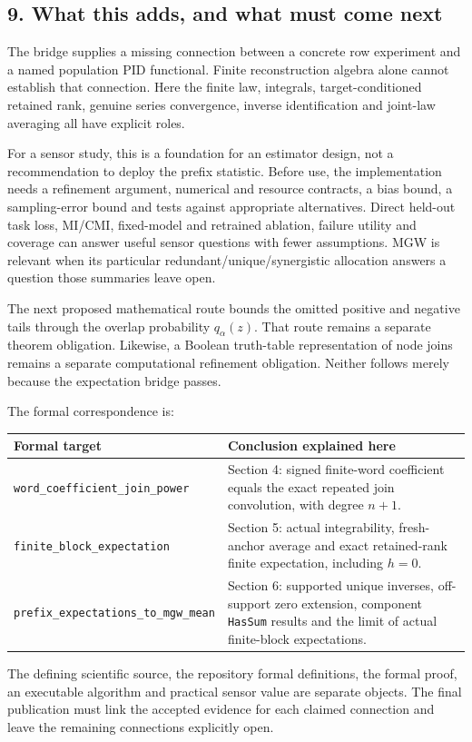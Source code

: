 \subsection{9. What this adds, and what must come next}\label{what-this-adds-and-what-must-come-next}

The bridge supplies a missing connection between a concrete row experiment and a named population PID functional. Finite reconstruction algebra alone cannot establish that connection. Here the finite law, integrals, target-conditioned retained rank, genuine series convergence, inverse identification and joint-law averaging all have explicit roles.

For a sensor study, this is a foundation for an estimator design, not a recommendation to deploy the prefix statistic. Before use, the implementation needs a refinement argument, numerical and resource contracts, a bias bound, a sampling-error bound and tests against appropriate alternatives. Direct held-out task loss, MI/CMI, fixed-model and retrained ablation, failure utility and coverage can answer useful sensor questions with fewer assumptions. MGW is relevant when its particular redundant/unique/synergistic allocation answers a question those summaries leave open.

The next proposed mathematical route bounds the omitted positive and negative tails through the overlap probability \(q_\alpha(z)\). That route remains a separate theorem obligation. Likewise, a Boolean truth-table representation of node joins remains a separate computational refinement obligation. Neither follows merely because the expectation bridge passes.

The formal correspondence is:

{\def\LTcaptype{none} %
\begin{longtable}[]{@{}
  >{\raggedright\arraybackslash}p{}
  >{\raggedright\arraybackslash}p{}@{}}
\toprule\noalign{}
\begin{minipage}[b]{\linewidth}\raggedright
Formal target
\end{minipage} & \begin{minipage}[b]{\linewidth}\raggedright
Conclusion explained here
\end{minipage} \\
\midrule\noalign{}
\endhead
\bottomrule\noalign{}
\endlastfoot
\texttt{word\_coefficient\_join\_power} & Section 4: signed finite-word coefficient equals the exact repeated join convolution, with degree \(n+1\). \\
\texttt{finite\_block\_expectation} & Section 5: actual integrability, fresh-anchor average and exact retained-rank finite expectation, including \(h=0\). \\
\texttt{prefix\_expectations\_to\_mgw\_mean} & Section 6: supported unique inverses, off-support zero extension, component \texttt{HasSum} results and the limit of actual finite-block expectations. \\
\end{longtable}
}

The defining scientific source, the repository formal definitions, the formal proof, an executable algorithm and practical sensor value are separate objects. The final publication must link the accepted evidence for each claimed connection and leave the remaining connections explicitly open.
